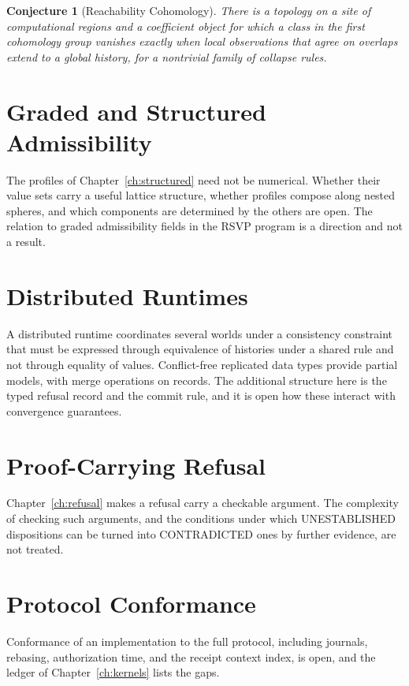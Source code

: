 \documentclass[12pt,oneside,openany]{book}
\theoremstyle{spherepop}
\newtheorem{conjecture}[definition]{Conjecture}
\theoremstyle{remarkstyle}
\begin{document}
\begin{conjecture}[Reachability Cohomology]
There is a topology on a site of computational regions and a coefficient object for which a class in the first cohomology group vanishes exactly when local observations that agree on overlaps extend to a global history, for a nontrivial family of collapse rules.
\end{conjecture}

\section{Graded and Structured Admissibility}

The profiles of Chapter~\ref{ch:structured} need not be numerical. Whether their value sets carry a useful lattice structure, whether profiles compose along nested spheres, and which components are determined by the others are open. The relation to graded admissibility fields in the RSVP program is a direction and not a result.

\section{Distributed Runtimes}

A distributed runtime coordinates several worlds under a consistency constraint that must be expressed through equivalence of histories under a shared rule and not through equality of values. Conflict-free replicated data types \cite{shapiro} provide partial models, with merge operations on records. The additional structure here is the typed refusal record and the commit rule, and it is open how these interact with convergence guarantees.

\section{Proof-Carrying Refusal}

Chapter~\ref{ch:refusal} makes a refusal carry a checkable argument. The complexity of checking such arguments, and the conditions under which \textsf{UNESTABLISHED} dispositions can be turned into \textsf{CONTRADICTED} ones by further evidence, are not treated.

\section{Protocol Conformance}

Conformance of an implementation to the full protocol, including journals, rebasing, authorization time, and the receipt context index, is open, and the ledger of Chapter~\ref{ch:kernels} lists the gaps.
\end{document}
